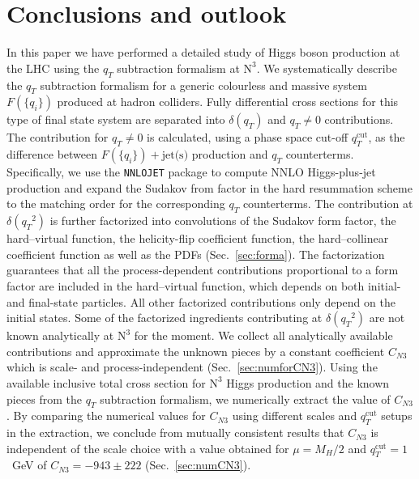 \documentclass[12pt]{article}
\DeclareRobustCommand{\qt}{\ensuremath{q_T}\xspace}
\DeclareRobustCommand{\qtcut}{\ensuremath{q_T^\mathrm{cut}}\xspace}
\DeclareRobustCommand{\jets}{\text{jet(s)}\xspace}
\DeclareRobustCommand{\LO}{\text{LO}\xspace}
\DeclareRobustCommand{\N}[1]{\ensuremath{\text{N}^{#1}}} %
\begin{document}
\section{Conclusions and outlook}
\label{Sec:conclu}
In this paper we have performed a detailed study of Higgs boson production at the LHC using the $\qt$ subtraction formalism at \N3\LO. We systematically describe the $\qt$ subtraction formalism for a generic colourless and massive system $F(\{q_i\})$ produced at hadron colliders. Fully differential cross sections for this type of final state system are separated into $\delta(\qt)$ and $\qt\ne 0$ contributions. The contribution for $\qt\ne 0$ is calculated, 
using a phase space cut-off $\qtcut$, as the difference between $F(\{q_i\})+\jets$ production and $\qt$ counterterms. Specifically, we use the \texttt{NNLOJET} package to compute NNLO Higgs-plus-jet production and expand the Sudakov from factor in the hard resummation scheme to the matching order for the corresponding $\qt$ counterterms. The contribution at $\delta(\qt^{2})$ is further factorized into convolutions of the Sudakov form factor, the hard--virtual function, the helicity-flip coefficient function, the hard--collinear coefficient function as well as the PDFs (Sec.~\ref{sec:forma}). The factorization guarantees that all the process-dependent contributions proportional to a form factor are included in the hard--virtual function, which depends on both initial- and final-state particles. All other factorized contributions only depend on the initial states. Some of the factorized ingredients contributing at $\delta(\qt^{2})$ are not known analytically at \N3\LO for the moment. We collect all analytically available contributions and approximate the unknown pieces by a constant coefficient $C_{N3}$ which is scale- and process-independent (Sec.~\ref{sec:numforCN3}). Using the available inclusive total cross section for \N3\LO Higgs production and the known pieces from  the $\qt$ subtraction formalism, we numerically extract the value of $C_{N3}$. By comparing the numerical values for $C_{N3}$ using different scales and $\qtcut$ setups in the extraction, we conclude from mutually consistent results that $C_{N3}$ is independent of the scale choice with a value obtained for $\mu=M_H/2$ and $\qtcut = 1$~GeV of $C_{N3}=-943\pm 222$ (Sec.~\ref{sec:numCN3}).
\end{document}
